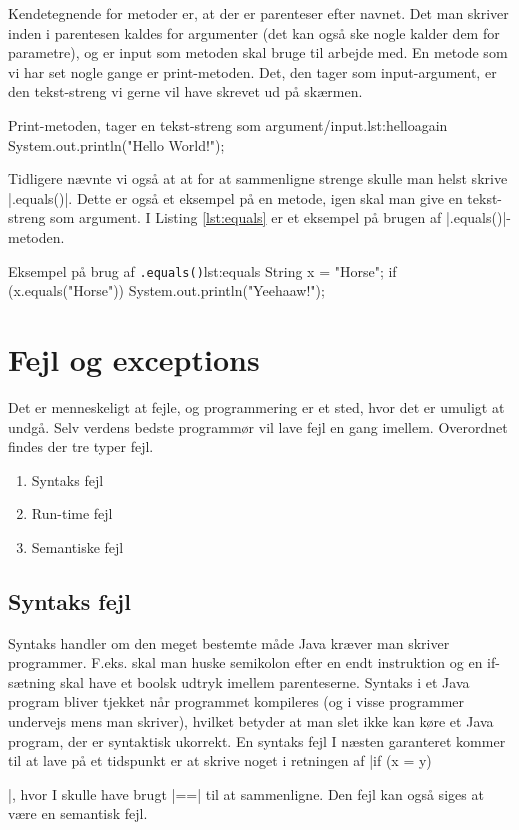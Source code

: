 {Kendetegnende for metoder er, at der er parenteser efter navnet. Det man skriver inden i parentesen kaldes for argumenter (det kan også ske nogle kalder dem for parametre), og er input som metoden skal bruge til arbejde med. En metode som vi har set nogle gange er print-metoden. Det, den tager som input-argument, er den tekst-streng vi gerne vil have skrevet ud på skærmen.

\begin{JavaCode}{Print-metoden, tager en tekst-streng som argument/input.}{lst:helloagain}
	System.out.println("Hello World!");
\end{JavaCode}

Tidligere nævnte vi også at at for at sammenligne strenge skulle man helst skrive \JavaInline|.equals()|. Dette er også et eksempel på en metode, igen skal man give en tekst-streng som argument. I Listing \ref{lst:equals} er et eksempel på brugen af \JavaInline|.equals()|-metoden.

\begin{JavaCode}{Eksempel på brug af \texttt{.equals()}}{lst:equals}
	String x = "Horse";
	if (x.equals("Horse")) {
		System.out.println("Yeehaaw!");
	}
\end{JavaCode}

\section{Fejl og exceptions}
Det er menneskeligt at fejle, og programmering er et sted, hvor det er umuligt at undgå. Selv verdens bedste programmør vil lave fejl en gang imellem. Overordnet findes der tre typer fejl.

\begin{enumerate}
	\item Syntaks fejl
	\item Run-time fejl
	\item Semantiske fejl
\end{enumerate}

\subsection{Syntaks fejl}
Syntaks handler om den meget bestemte måde Java kræver man skriver programmer. F.eks. skal man huske semikolon efter en endt instruktion og en if-sætning skal have et boolsk udtryk imellem parenteserne. Syntaks i et Java program bliver tjekket når programmet kompileres (og i visse programmer undervejs mens man skriver), hvilket betyder at man slet ikke kan køre et Java program, der er syntaktisk ukorrekt. En syntaks fejl I næsten garanteret kommer til at lave på et tidspunkt er at skrive noget i retningen af \JavaInline|if (x = y) {|, hvor I skulle have brugt \JavaInline|==| til at sammenligne. Den fejl kan også siges at være en semantisk fejl.

}}
